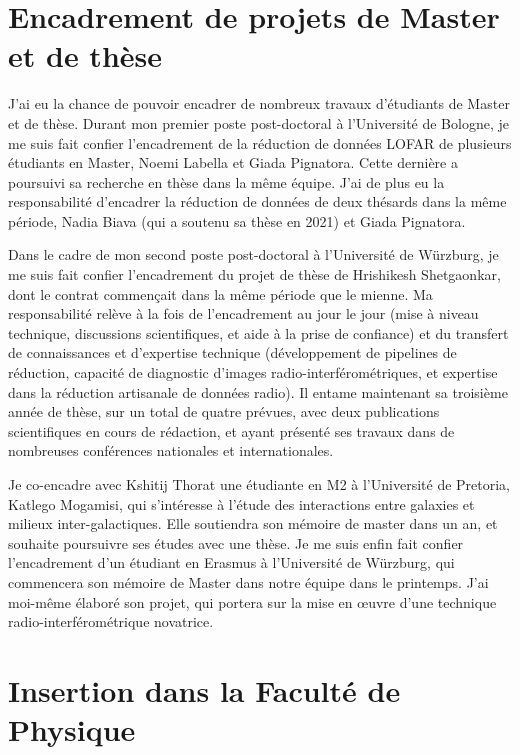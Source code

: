 \section{Encadrement de projets de Master et de th\`ese}

\pg
J'ai eu la chance de pouvoir encadrer de nombreux travaux d'\'etudiants de Master et de th\`ese. Durant mon premier poste post-doctoral \`a l'Universit\'e de Bologne, je me suis fait confier l'encadrement de la r\'eduction de donn\'ees LOFAR de plusieurs \'etudiants en Master, Noemi Labella et Giada Pignatora. Cette derni\`ere a poursuivi sa recherche en th\`ese dans la m\^eme \'equipe. J'ai de plus eu la responsabilit\'e d'encadrer la r\'eduction de donn\'ees de deux th\'esards dans la m\^eme p\'eriode, Nadia Biava (qui a soutenu sa th\`ese en 2021) et Giada Pignatora.

\pg
Dans le cadre de mon second poste post-doctoral \`a l'Universit\'e de W\"urzburg, je me suis fait confier l'encadrement du projet de th\`ese de Hrishikesh Shetgaonkar, dont le contrat commen\c{c}ait dans la m\^eme p\'eriode que le mienne. Ma responsabilit\'e rel\`eve \`a la fois de l'encadrement au jour le jour (mise \`a niveau technique, discussions scientifiques, et aide \`a la prise de confiance) et du transfert de connaissances et d'expertise technique (d\'eveloppement de pipelines de r\'eduction, capacit\'e de diagnostic d'images radio-interf\'erom\'etriques, et expertise dans la r\'eduction artisanale de donn\'ees radio). Il entame maintenant sa troisi\`eme ann\'ee de th\`ese, sur un total de quatre pr\'evues, avec deux publications scientifiques en cours de r\'edaction, et ayant pr\'esent\'e ses travaux dans de nombreuses conf\'erences nationales et internationales. 

\pg
Je co-encadre avec Kshitij Thorat une \'etudiante en M2 \`a l'Universit\'e de Pretoria, Katlego Mogamisi, qui s'int\'eresse \`a l'\'etude des interactions entre galaxies et milieux inter-galactiques. Elle soutiendra son m\'emoire de master dans un an, et souhaite poursuivre ses \'etudes avec une th\`ese. Je me suis enfin fait confier l'encadrement d'un \'etudiant en Erasmus \`a l'Universit\'e de W\"urzburg, qui commencera son m\'emoire de Master dans notre \'equipe dans le printemps. J'ai moi-m\^eme \'elabor\'e son projet, qui portera sur la mise en {\oe}uvre d'une technique radio-interf\'erom\'etrique novatrice. 

\section{Insertion dans la Facult\'e de Physique}

